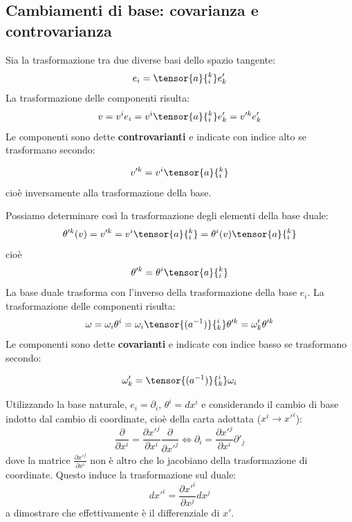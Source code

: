 \subsection{Cambiamenti di base: covarianza e controvarianza}
Sia la trasformazione tra due diverse basi dello spazio tangente:
\begin{equation}
    e_i= \tensor{a}{_i ^k} e'_k
    \label{eq.basetransvett}
\end{equation}
La trasformazione delle componenti risulta:
\begin{equation*}
    v= v^i e_i = v^i \tensor{a}{_i ^k} e'_k = v'^k e'_k
\end{equation*}
Le componenti sono dette \textbf{controvarianti} e indicate con indice alto se trasformano secondo:

\begin{equation}
    v'^k = v^i \tensor{a}{_i^k}
    \label{eq.contrav}
\end{equation}
cioè inversamente alla trasformazione della base.

Possiamo determinare così la trasformazione degli elementi della base duale:
\begin{equation*}
    \theta'^k(v) = v'^k = v^i \tensor{a}{_i^k} = \theta^i(v)  \tensor{a}{_i^k}
\end{equation*}
cioè
\begin{equation}
     \theta'^k = \theta^i  \tensor{a}{_i^k}
     \label{eq.basetranscovett}
\end{equation}
La base duale trasforma con l'inverso della trasformazione della base ${e_i}$.
La trasformazione delle componenti risulta:
\begin{equation*}
     \omega = \omega_i \theta^i = \omega_i \tensor{(a^{-1})}{_k^i} \theta'^k = \omega'_k \theta'^k
\end{equation*}
Le componenti sono dette \textbf{covarianti} e indicate con indice basso se trasformano secondo:

\begin{equation}
     \omega'_k = \tensor{(a^{-1})}{_k^i} \omega_i
     \label{eq.covar}
\end{equation}

Utilizzando la base naturale, $e_i =\partial_i$, $\theta^i=dx^i$ e considerando il cambio di base indotto dal cambio di coordinate, cioè della carta adottata ($x^i \rightarrow x'^i$):
\begin{equation*}
    \frac{\partial}{\partial x^i} = \frac{\partial x'^j}{\partial x^i}\frac{\partial}{\partial x'^j} \iff \partial_i = \frac{\partial x'^j}{\partial x^i} \partial'_j
\end{equation*}
dove la matrice $\frac{\partial x'^j}{\partial x^i}$ non è altro che lo jacobiano della trasformazione di coordinate.
Questo induce la trasformazione sul duale:
\begin{equation*}
    dx'^i = \frac{\partial x'^i}{\partial x^j} dx^j
\end{equation*}
a dimostrare che effettivamente è il differenziale di $x'$.
